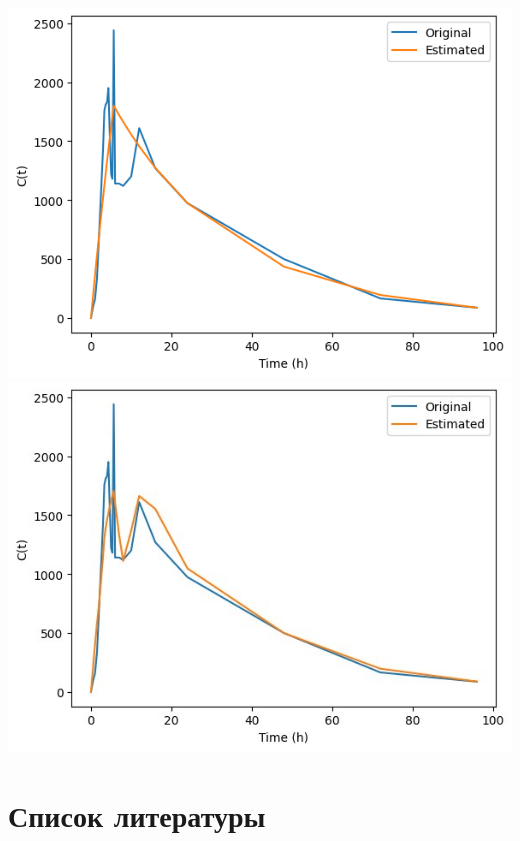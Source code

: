 \documentclass[12pt]{article}
\begin{document}
\includegraphics{results/basic_6.png}\newline
\includegraphics{results/6.jpg}\newline


\newpage

\section*{Список литературы}
\end{document}
